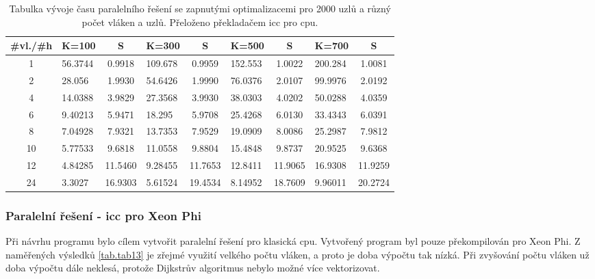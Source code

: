 \documentclass[a4paper,11pt]{article}
\begin{document}
      \begin{table}[ht]
  \begin{center}
   \begin{tabular}{|c|l|c|l|c|l|c|l|c|}
    \hline 
    \#vl./\#h & K=100 & S & K=300 & S & K=500 & S & K=700 & S\\
   \hline 
   \hline 
   1 & 56.3744 & 0.9918 & 109.678 & 0.9959  & 152.553 & 1.0022 & 200.284 & 1.0081 \\
   \hline
    2 & 28.056 & 1.9930 & 54.6426 & 1.9990 & 76.0376 & 2.0107 & 99.9976 & 2.0192\\
   \hline
    4 & 14.0388 & 3.9829  & 27.3568 & 3.9930  & 38.0303 & 4.0202 & 50.0288 & 4.0359\\
   \hline 
    6 & 9.40213 & 5.9471  & 18.295 & 5.9708 & 25.4268 & 6.0130 & 33.4343 & 6.0391\\
   \hline
    8 & 7.04928 & 7.9321 & 13.7353 & 7.9529 & 19.0909 & 8.0086 & 25.2987 & 7.9812\\
   \hline
    10 & 5.77533 & 9.6818  & 11.0558 & 9.8804  & 15.4848 & 9.8737  & 20.9525 & 9.6368\\
   \hline
    12 & 4.84285 & 11.5460 & 9.28455 & 11.7653 & 12.8411 & 11.9065 & 16.9308 & 11.9259 \\
   \hline
    24 & 3.3027 & 16.9303  & 5.61524 & 19.4534 & 8.14952 & 18.7609 & 9.96011 & 20.2724\\
   \hline
   \hline
    \end{tabular}
   \caption{Tabulka vývoje času paralelního řešení se zapnutými optimalizacemi pro 2000 uzlů a různý počet vláken a uzlů. Přeloženo 
   překladačem icc pro cpu.} 
   \label{tab.tab12}
  \end{center}   
  \end{table}
  
  \subsubsection{Paralelní řešení - icc pro Xeon Phi}
  Při návrhu programu bylo cílem vytvořit paralelní řešení pro klasická cpu. Vytvořený program byl
  pouze překompilován pro Xeon Phi. Z naměřených výsledků \ref{tab.tab13} je zřejmé využití velkého počtu vláken, a proto
  je doba výpočtu tak nízká. Při zvyšování počtu vláken už doba výpočtu dále neklesá, protože Dijkstrův
  algoritmus nebylo možné více vektorizovat.
\end{document}
